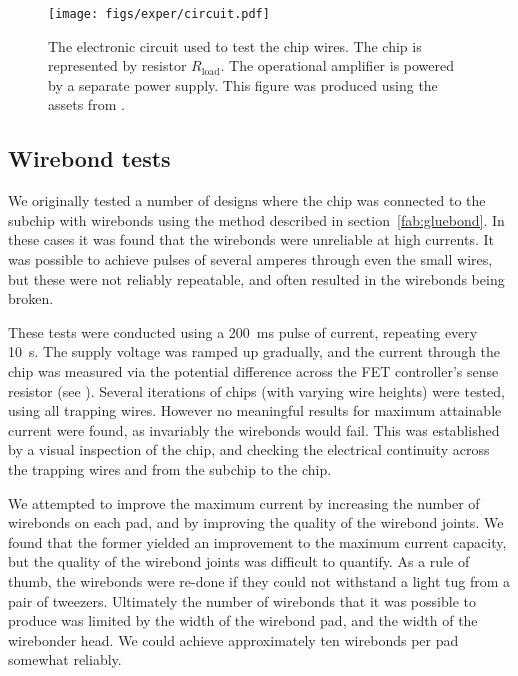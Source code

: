 
\begin{figure}[htb]
  \centering
  \texttt{[image: figs/exper/circuit.pdf]}
  \caption[Current testing electronics]{
    The electronic circuit used to test the chip wires. The chip is
  represented by resistor $R_\text{load}$. The operational amplifier is powered
  by a separate power supply. This figure was produced using the assets from
  .}
  \label{exper:fig:curtest}
\end{figure}

\subsection{Wirebond tests}

We originally tested a number of designs where the chip was connected to the
subchip with wirebonds using the method described in
section~\ref{fab:gluebond}. In these cases it was found that the wirebonds were
unreliable at high currents. It was possible to achieve pulses of several
amperes through even the small wires, but these were not reliably repeatable,
and often resulted in the wirebonds being broken.

These tests were conducted using a \SI{200}{\milli\second} pulse of current,
repeating every \SI{10}{\second}. The supply voltage was ramped up gradually,
and the current through the chip was measured via the potential difference
across the FET controller's sense resistor (see ).
Several iterations of chips (with varying wire heights) were tested, using all
trapping wires. However no meaningful results for maximum attainable current
were found, as invariably the wirebonds would fail. This was established by a
visual inspection of the chip, and checking the electrical continuity across
the trapping wires and from the subchip to the chip.

We attempted to improve the maximum current by increasing the number of
wirebonds on each pad, and by improving the quality of the wirebond joints. We
found that the former yielded an improvement to the maximum current capacity,
but the quality of the wirebond joints was difficult to quantify. As a rule of
thumb, the wirebonds were re-done if they could not withstand a light tug from
a pair of tweezers. Ultimately the number of wirebonds that it was possible to
produce was limited by the width of the wirebond pad, and the width of the
wirebonder head. We could achieve approximately ten wirebonds per pad somewhat
reliably.

